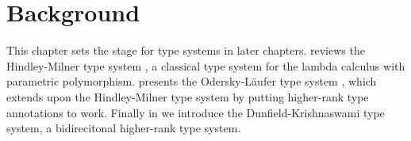\chapter{Background}
\label{chap:Background}

This chapter sets the stage for type systems in later chapters. 
reviews the Hindley-Milner type system \citep{Damas:Milner,hindley,milner}, a
classical type system for the lambda calculus with parametric polymorphism.
 presents the Odersky-L{\"a}ufer type system
\citep{odersky:putting}, which extends upon the Hindley-Milner type system by
putting higher-rank type annotations to work. Finally in  we
introduce the Dunfield-Krishnaswami type system, a bidirecitonal higher-rank
type system.







